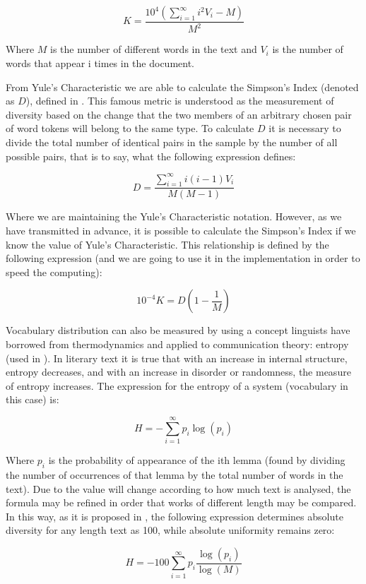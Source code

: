 $$
K = \frac{10^4\left(\sum_{i = 1}^\infty i^2V_i-M\right)}{M^2}
$$

Where $M$ is the number of different words in the text and $V_i$ is the number of words that appear i times in the document.

From Yule's Characteristic we are able to calculate the Simpson's Index (denoted as $D$), defined in \cite{simpson1949measurement}. This famous metric is understood as the measurement of diversity based on the change that the two members of an arbitrary chosen pair of word tokens will belong to the same type. To calculate $D$ it is necessary to divide the total number of identical pairs in the sample by the number of all possible pairs, that is to say, what the following expression defines:

$$
D = \frac{\sum_{i = 1}^\infty i(i-1)V_i}{M(M-1)}
$$

Where we are maintaining the Yule's Characteristic notation. However, as we have transmitted in advance, it is possible to calculate the Simpson's Index if we know the value of Yule's Characteristic. This relationship is defined by the following expression (and we are going to use it in the implementation in order to speed the computing):

$$
10^{-4}K=D\left(1-\frac{1}{M}\right)
$$

Vocabulary distribution can also be measured by using a concept linguists have borrowed from thermodynamics and applied to communication theory: entropy (used in \cite{holmes1985analysis}). In literary text it is true that with an increase in internal structure, entropy decreases, and with an increase in disorder or randomness, the measure of entropy increases. The expression for the entropy of a system (vocabulary in this case) is:

$$
H = -\sum_{i=1}^{\infty} p_i\log(p_i)
$$

Where $p_i$ is the probability of appearance of the ith lemma (found by dividing the number of occurrences of that lemma by the total number of words in the text). Due to the value will change according to how much text is analysed, the formula may be refined in order that works of different length may be compared. In this way, as it is proposed in \cite{holmes1985analysis}, the following expression determines absolute diversity for any length text as 100, while absolute uniformity remains zero:

$$
H=-100\sum_{i = 1}^{\infty}p_i\frac{\log(p_i)}{\log(M)}
$$

